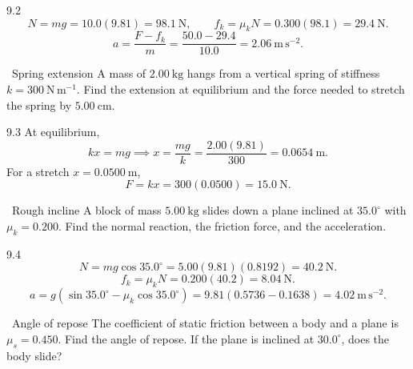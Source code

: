 \begin{tabletworkspace}[6.5cm]
\end{tabletworkspace}

\begin{solution}{9.2}
\[
N=mg=10.0(9.81)=98.1\ \mathrm{N},\qquad
f_k=\mu_kN=0.300(98.1)=29.4\ \mathrm{N}.
\]
\[
a=\frac{F-f_k}{m}=\frac{50.0-29.4}{10.0}=2.06\ \mathrm{m\,s^{-2}}.
\]
\end{solution}

\begin{exercise}{\warm\ Spring extension}
A mass of $2.00\ \mathrm{kg}$ hangs from a vertical spring of stiffness
$k=300\ \mathrm{N\,m^{-1}}$. Find the extension at equilibrium and the force
needed to stretch the spring by $5.00\ \mathrm{cm}$.
\end{exercise}

\begin{tabletworkspace}[6.5cm]
\end{tabletworkspace}

\begin{solution}{9.3}
At equilibrium,
\[
kx=mg
\implies
x=\frac{mg}{k}=\frac{2.00(9.81)}{300}=0.0654\ \mathrm{m}.
\]
For a stretch $x=0.0500\ \mathrm{m}$,
\[
F=kx=300(0.0500)=15.0\ \mathrm{N}.
\]
\end{solution}

\begin{exercise}{\core\ Rough incline}
A block of mass $5.00\ \mathrm{kg}$ slides down a plane inclined at
$35.0^\circ$ with $\mu_k=0.200$. Find the normal reaction, the friction force,
and the acceleration.
\end{exercise}

\begin{tabletworkspace}[6.5cm]
\end{tabletworkspace}

\begin{solution}{9.4}
\[
N=mg\cos35.0^\circ=5.00(9.81)(0.8192)=40.2\ \mathrm{N}.
\]
\[
f_k=\mu_kN=0.200(40.2)=8.04\ \mathrm{N}.
\]
\[
a=g(\sin35.0^\circ-\mu_k\cos35.0^\circ)
=9.81(0.5736-0.1638)=4.02\ \mathrm{m\,s^{-2}}.
\]
\end{solution}

\begin{exercise}{\core\ Angle of repose}
The coefficient of static friction between a body and a plane is $\mu_s=0.450$.
Find the angle of repose. If the plane is inclined at $30.0^\circ$, does the body
slide?
\end{exercise}


